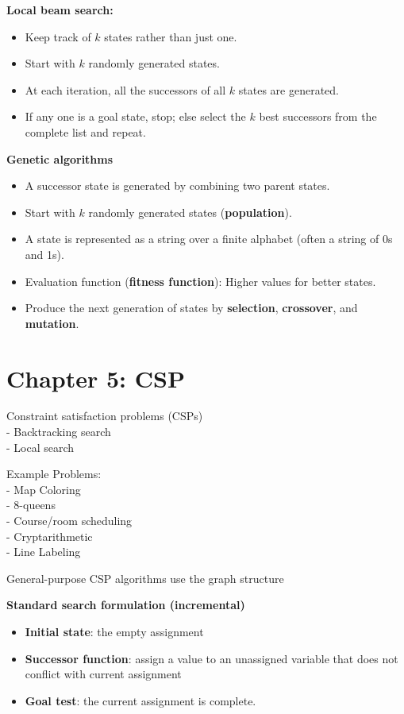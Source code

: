 \documentclass{../cheat}
\begin{document}
\begin{multicols}{3}
		
		\textbf{Local beam search:}
		\begin{itemize}
			\item Keep track of $k$ states rather than just one.
			\item Start with $k$ randomly generated states.
			\item At each iteration, all the successors of all $k$ states are generated.
			\item If any one is a goal state, stop; else select the $k$ best successors from the complete list and repeat.		
		\end{itemize}
		 
		 \textbf{Genetic algorithms}
		 \begin{itemize}
			\item A successor state is generated by combining two parent states.
			\item Start with $k$ randomly generated states (\textbf{population}).
			\item A state is represented as a string over a finite alphabet (often a string of 0s and 1s).
			\item Evaluation function (\textbf{fitness function}): Higher values for better states.
			\item Produce the next generation of states by \textbf{selection}, \textbf{crossover}, and \textbf{mutation}.
		 \end{itemize}

	\section{Chapter 5: CSP}
		Constraint satisfaction problems (CSPs)\\
		  - Backtracking search\\
		  - Local search
		
		Example Problems:\\
		  - Map Coloring\\
		  - 8-queens\\
		  - Course/room scheduling\\
		  - Cryptarithmetic\\
		  - Line Labeling
		
		General-purpose CSP algorithms use the graph structure
		
		\textbf{Standard search formulation (incremental)}
		\begin{itemize}
			\item \textbf{Initial state}: the empty assignment
			\item \textbf{Successor function}: assign a value to an unassigned variable that does not conflict with current assignment
			\item \textbf{Goal test}: the current assignment is complete.		
		\end{itemize}


\end{multicols}
\end{document}
